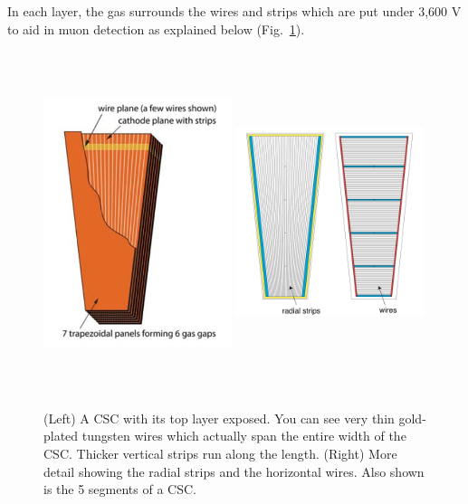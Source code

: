 In each layer, the gas surrounds the wires and strips which are put under 3,600 V to aid in muon detection as explained below (Fig.~\ref{fig:csc_guts}). 
\begin{figure}[pbth]
\centering
\includegraphics[width=0.49\textwidth,height=10cm,keepaspectratio]{figures/cms/muonsys/csc_cutaway_view_new.png}
\includegraphics[width=0.49\textwidth,height=10cm,keepaspectratio]{figures/cms/muonsys/csc_stripsandwires.png}
    \caption{
    (Left) A CSC with its top layer exposed. You can see very thin gold-plated tungsten wires which actually span the entire width of the CSC. 
    Thicker vertical strips run along the length.
    (Right) More detail showing the radial strips and the horizontal wires. Also shown is the 5 segments of a CSC.
    }
    \label{fig:csc_guts}
\end{figure}

